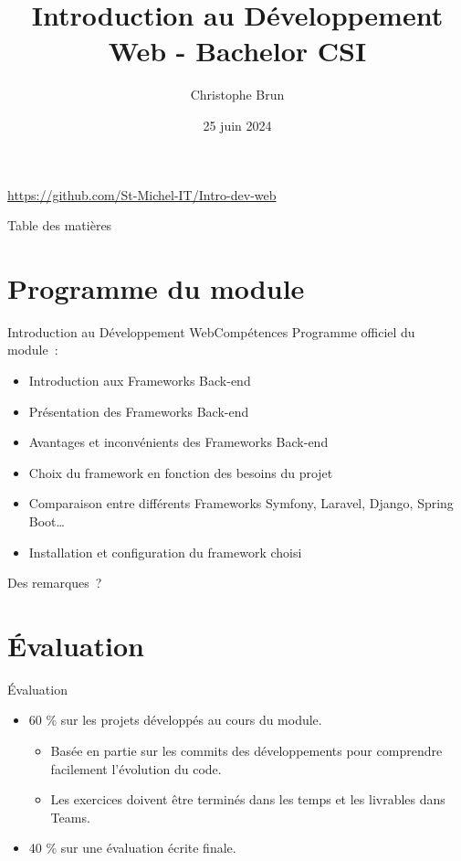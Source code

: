 \documentclass{beamer}
\title{Introduction au Développement Web - Bachelor CSI}
\author{Christophe Brun}
\institute{Campus Saint-Michel IT}
\date{25 juin 2024}
\begin{document}
    \begin{frame}
        \titlepage
        \bigbreak
        \centering
        \url{https://github.com/St-Michel-IT/Intro-dev-web}
    \end{frame}

    \begin{frame}{Table des matières}
        \tableofcontents
    \end{frame}


    \section{Programme du module}\label{sec:programme-du-module}
    \begin{frame}{Introduction au Développement Web}{Compétences}
        Programme officiel du module~:
        \begin{itemize}
            \item Introduction aux Frameworks Back-end
            \item Présentation des Frameworks Back-end
            \item Avantages et inconvénients des Frameworks Back-end
            \item Choix du framework en fonction des besoins du projet
            \item Comparaison entre différents Frameworks Symfony, Laravel, Django, Spring Boot\ldots
            \item Installation et configuration du framework choisi
        \end{itemize}
        \bigbreak
        Des remarques~?
    \end{frame}


    \section{Évaluation}\label{sec:evaluation}
    \begin{frame}{Évaluation}
        \begin{itemize}
            \item 60 \% sur les projets développés au cours du module.
            \begin{itemize}
                \item Basée en partie sur les commits des développements pour comprendre facilement l'évolution du code.
                \item Les exercices doivent être terminés dans les temps et les livrables dans Teams.
            \end{itemize}
            \item 40 \% sur une évaluation écrite finale.
        \end{itemize}
    \end{frame}
\end{document}
